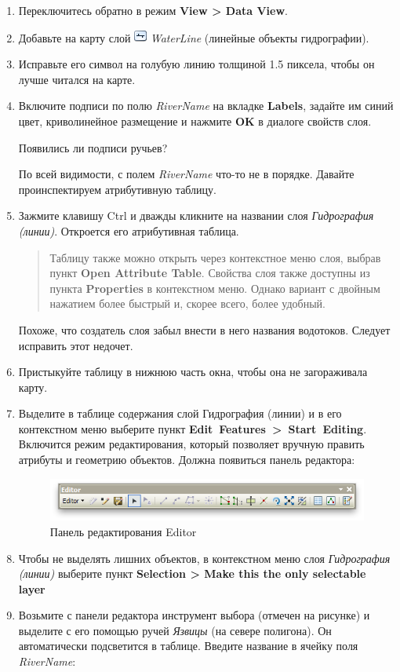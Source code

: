 \documentclass[]{book}
\theoremstyle{definition}
\theoremstyle{definition}
\theoremstyle{definition}
\theoremstyle{remark}
\begin{document}
\begin{enumerate}
\def\labelenumi{\arabic{enumi}.}
\item
  Переключитесь обратно в режим \textbf{View \textgreater{} Data View}.
\item
  Добавьте на карту слой \includegraphics{images/Ex01/image8.png}
  \emph{WaterLine} (линейные объекты гидрографии).
\item
  Исправьте его символ на голубую линию толщиной 1.5 пиксела, чтобы он
  лучше читался на карте.
\item
  Включите подписи по полю \emph{RiverName} на вкладке \textbf{Labels},
  задайте им синий цвет, криволинейное размещение и нажмите \textbf{OK}
  в диалоге свойств слоя.

  Появились ли подписи ручьев?

  По всей видимости, с полем \emph{RiverName} что-то не в порядке.
  Давайте проинспектируем атрибутивную таблицу.
\item
  Зажмите клавишу Ctrl и дважды кликните на названии слоя
  \emph{Гидрография (линии)}. Откроется его атрибутивная таблица.

  \begin{quote}
  Таблицу также можно открыть через контекстное меню слоя, выбрав пункт
  \textbf{Open Attribute Table}. Свойства слоя также доступны из пункта
  \textbf{Properties} в контекстном меню. Однако вариант с двойным
  нажатием более быстрый и, скорее всего, более удобный.
  \end{quote}

  Похоже, что создатель слоя забыл внести в него названия водотоков.
  Следует исправить этот недочет.
\item
  Пристыкуйте таблицу в нижнюю часть окна, чтобы она не загораживала
  карту.
\item
  Выделите в таблице содержания слой Гидрография (линии) и в его
  контекстном меню выберите пункт
  \textbf{Edit~Features~\textgreater{}~Start~Editing}. Включится режим
  редактирования, который позволяет вручную править атрибуты и геометрию
  объектов. Должна появиться панель редактора:

  \begin{figure}
  \centering
  \includegraphics{images/Ex01/image21.png}
  \caption{Панель редактирования Editor}
  \end{figure}
\item
  Чтобы не выделять лишних объектов, в контекстном меню слоя
  \emph{Гидрография (линии)} выберите пункт \textbf{Selection
  \textgreater{} Make this the only selectable layer}
\item
  Возьмите с панели редактора инструмент выбора (отмечен на рисунке) и
  выделите с его помощью ручей \emph{Язвицы} (на севере полигона). Он
  автоматически подсветится в таблице. Введите название в ячейку поля
  \emph{RiverName}:


\end{enumerate}
\end{document}
